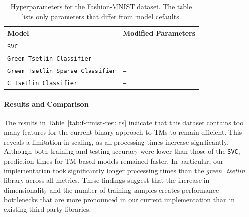 \documentclass[english]{aghengthesis} %
\newcommand*{\GreenTsetlinName}{\emph{green\_tsetlin}~\cite{glimsdal2024greentsetlin} }
\begin{document}
\begin{table}[!htbp]
\centering
\caption[Fashion-MNIST Hyperparameters]{Hyperparameters for the Fashion-MNIST dataset. The table lists only parameters that differ from model defaults.}
\begin{tabularx}{\columnwidth}{@{}l L@{}} \toprule
    \textbf{Model} & \textbf{Modified Parameters} \\ \midrule \midrule
    \texttt{SVC} & \texttt{---} \\ \midrule \midrule
    \texttt{Green Tsetlin Classifier} & \texttt{---} \\ \midrule
    \texttt{Green Tsetlin Sparse Classifier} & \texttt{---} \\ \midrule
    \texttt{C Tsetlin Classifier} & \texttt{---} \\ \bottomrule
\end{tabularx}
\label{tab:f-mnist-params}
\end{table}

\paragraph{Results and Comparison}
The results in Table~\ref{tab:f-mnist-results} indicate that this dataset contains too many features for the current binary approach to TMs to remain efficient. This reveals a limitation in scaling, as all processing times increase significantly. Although both training and testing accuracy were lower than those of the \texttt{SVC}, prediction times for TM-based models remained faster. In particular, our implementation took significantly longer processing times than the \GreenTsetlinName library across all metrics. These findings suggest that the increase in dimensionality and the number of training samples creates performance bottlenecks that are more pronounced in our current implementation than in existing third-party libraries.
\end{document}
